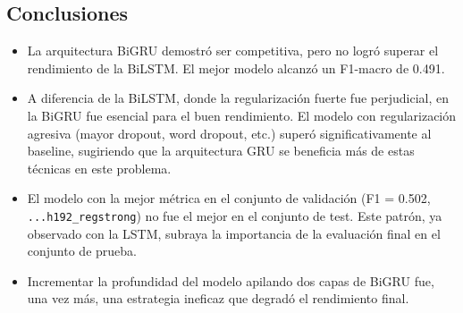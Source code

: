 \begin{table}[h!]
    \centering
    \caption{BiGRU — Resumen de experimentos en MeIA (polaridad 1–5).}
    \label{tab:gru_meia_transposed}
\end{table}


\subsection{Conclusiones}


\begin{itemize}
    \item La arquitectura BiGRU demostró ser competitiva, pero no logró superar el rendimiento de la BiLSTM. El mejor modelo alcanzó un F1-macro de 0.491.
    \item A diferencia de la BiLSTM, donde la regularización fuerte fue perjudicial, en la BiGRU fue esencial para el buen rendimiento. El modelo con regularización 
    agresiva (mayor dropout, word dropout, etc.) superó significativamente al baseline, sugiriendo que la arquitectura GRU se beneficia más de estas técnicas en este problema.
    \item El modelo con la mejor métrica en el conjunto de validación (F1 = 0.502, \texttt{...h192\_regstrong}) no fue el mejor en el conjunto de test. Este patrón, ya observado con la LSTM, subraya la importancia de la evaluación final en el conjunto de prueba.
    \item Incrementar la profundidad del modelo apilando dos capas de BiGRU fue, una vez más, una estrategia ineficaz que degradó el rendimiento final.
\end{itemize}


